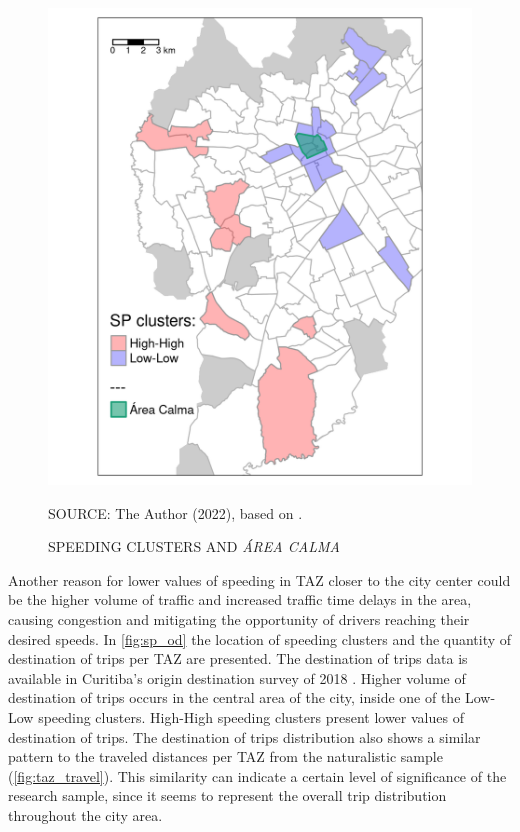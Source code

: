 \begin{figure}[!htbp]
    \footnotesize
    \captionsetup{font=footnotesize}
    \caption{SPEEDING CLUSTERS AND \textit{ÁREA CALMA}}
    \centering
    \includegraphics{fig/area_calma_plot.png}
    \label{fig:sp_area_calma}
    \par SOURCE: The Author (2022), based on \textcite{IPPUC2021}.
\end{figure}

Another reason for lower values of speeding in TAZ closer to the city center could be the higher volume of traffic and increased traffic time delays in the area, causing congestion and mitigating the opportunity of drivers reaching their desired speeds. In \autoref{fig:sp_od} the location of speeding clusters and the quantity of destination of trips per TAZ are presented. The destination of trips data is available in Curitiba's origin destination survey of 2018 \cite{IPPUC2018b}. Higher volume of destination of trips occurs in the central area of the city, inside one of the Low-Low speeding clusters. High-High speeding clusters present lower values of destination of trips. The destination of trips distribution also shows a similar pattern to the traveled distances per TAZ from the naturalistic sample (\autoref{fig:taz_travel}). This similarity can indicate a certain level of significance of the research sample, since it seems to represent the overall trip distribution throughout the city area.

